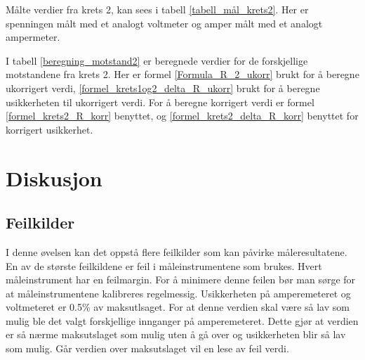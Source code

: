 \documentclass[twocolumn, a4paper, 11pt]{article} %
\begin{document}
Målte verdier fra krets 2, kan sees i tabell \ref{tabell_mål_krets2}. Her er spenningen målt med et analogt voltmeter og amper målt med et analogt ampermeter.

\begin{table}[H]
\centering
\caption{Krets 2.}
\label{tabell_mål_krets2}
\end{table}


I tabell \ref{beregning_motstand2} er beregnede verdier for de forskjellige motstandene fra krets 2. Her er formel \eqref{Formula_R_2_ukorr} brukt for å beregne ukorrigert verdi, \eqref{formel_krets1og2_delta_R_ukorr} brukt for å beregne usikkerheten til  ukorrigert verdi. For å beregne korrigert verdi er formel \eqref{formel_krets2_R_korr} benyttet, og \eqref{formel_krets2_delta_R_korr} benyttet for korrigert usikkerhet.


\begin{table}[H]
\centering
\caption{Krets 2 motstand beregning.}
\label{beregning_motstand2}
\end{table}



\section{Diskusjon}

\subsection{Feilkilder}
I denne øvelsen kan det oppstå flere feilkilder som kan påvirke måleresultatene. 
En av de største feilkildene er feil i måleinstrumentene som brukes. Hvert måleinstrument har en feilmargin. For å minimere denne feilen bør man sørge for at måleinstrumentene kalibreres regelmessig. Usikkerheten på amperemeteret og voltmeteret er 0.5\% av maksutlsaget. For at denne verdien skal være så lav som mulig ble det valgt forskjellige innganger på amperemeteret. Dette gjør at verdien er så nærme maksutslaget som mulig uten å gå over og usikkerheten blir så lav som mulig. Går verdien over maksutslaget vil en lese av feil verdi.
\end{document}
